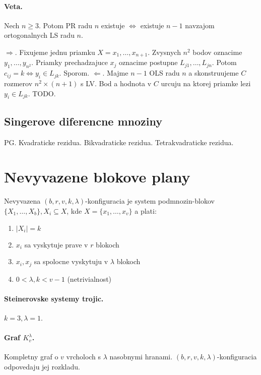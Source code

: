 \documentclass[10pt,a4paper]{article}
\begin{document}
\paragraph{Veta.}
Nech $n \geq 3$. Potom PR radu $n$ existuje $\Leftrightarrow$ existuje $n-1$ navzajom ortogonalnych LS radu $n$. 

$\Rightarrow$. Fixujeme jednu priamku $X={x_1, \ldots, x_{n+1}}$. Zvysnych $n^2$ bodov oznacime $y_1,\ldots,y_{n^2}$. Priamky prechadzajuce $x_j$ oznacime postupne $L_{j1},\ldots,L_{jn}$. Potom $c_{ij}=k \Leftrightarrow y_i \in L_{jk}$. Sporom. 
$\Leftarrow$. Majme $n-1$ OLS radu $n$ a skonstruujeme $C$ rozmerov $n^2 \times (n+1)$ s LV. Bod a hodnota v $C$ urcuju na ktorej priamke lezi $y_i \in L_{jk}$. 
TODO. 

\subsection{Singerove diferencne mnoziny}
PG. Kvadraticke rezidua. Bikvadraticke rezidua. Tetrakvadraticke rezidua.


\section{Nevyvazene blokove plany} 
Nevyvazena $(b,r,v,k,\lambda)$-konfiguracia je system podmnozin-blokov $\{X_1, \ldots, X_b\}, X_i \subseteq X$, kde $X = \{x_1,\ldots, x_v\}$ a plati:
\begin{enumerate}
\item $|X_i|=k$
\item $x_i$ sa vyskytuje prave v $r$ blokoch 
\item $x_i, x_j$ sa spolocne vyskytuju v $\lambda$ blokoch 
\item $0 < \lambda, k < v-1$ (netrivialnost)
\end{enumerate}

\paragraph{Steinerovske systemy trojic.}
$k=3, \lambda=1$. 
\paragraph{Graf $K_v^\lambda$.}
Kompletny graf o $v$ vrcholoch s $\lambda$ nasobnymi hranami. $(b,r,v,k,\lambda)$-konfiguracia odpovedaju jej rozkladu. 
\end{document}
